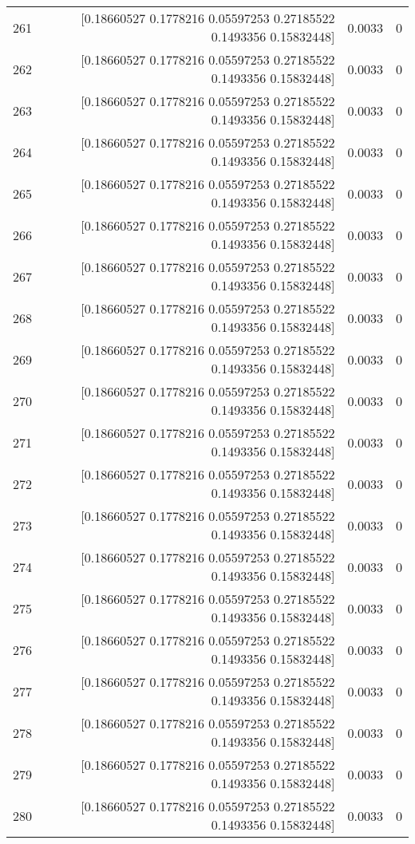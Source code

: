 \begin{longtable}{lrrr}
261 & [0.18660527 0.1778216  0.05597253 0.27185522 0.1493356  0.15832448] & 0.0033 & 0 \\
262 & [0.18660527 0.1778216  0.05597253 0.27185522 0.1493356  0.15832448] & 0.0033 & 0 \\
263 & [0.18660527 0.1778216  0.05597253 0.27185522 0.1493356  0.15832448] & 0.0033 & 0 \\
264 & [0.18660527 0.1778216  0.05597253 0.27185522 0.1493356  0.15832448] & 0.0033 & 0 \\
265 & [0.18660527 0.1778216  0.05597253 0.27185522 0.1493356  0.15832448] & 0.0033 & 0 \\
266 & [0.18660527 0.1778216  0.05597253 0.27185522 0.1493356  0.15832448] & 0.0033 & 0 \\
267 & [0.18660527 0.1778216  0.05597253 0.27185522 0.1493356  0.15832448] & 0.0033 & 0 \\
268 & [0.18660527 0.1778216  0.05597253 0.27185522 0.1493356  0.15832448] & 0.0033 & 0 \\
269 & [0.18660527 0.1778216  0.05597253 0.27185522 0.1493356  0.15832448] & 0.0033 & 0 \\
270 & [0.18660527 0.1778216  0.05597253 0.27185522 0.1493356  0.15832448] & 0.0033 & 0 \\
271 & [0.18660527 0.1778216  0.05597253 0.27185522 0.1493356  0.15832448] & 0.0033 & 0 \\
272 & [0.18660527 0.1778216  0.05597253 0.27185522 0.1493356  0.15832448] & 0.0033 & 0 \\
273 & [0.18660527 0.1778216  0.05597253 0.27185522 0.1493356  0.15832448] & 0.0033 & 0 \\
274 & [0.18660527 0.1778216  0.05597253 0.27185522 0.1493356  0.15832448] & 0.0033 & 0 \\
275 & [0.18660527 0.1778216  0.05597253 0.27185522 0.1493356  0.15832448] & 0.0033 & 0 \\
276 & [0.18660527 0.1778216  0.05597253 0.27185522 0.1493356  0.15832448] & 0.0033 & 0 \\
277 & [0.18660527 0.1778216  0.05597253 0.27185522 0.1493356  0.15832448] & 0.0033 & 0 \\
278 & [0.18660527 0.1778216  0.05597253 0.27185522 0.1493356  0.15832448] & 0.0033 & 0 \\
279 & [0.18660527 0.1778216  0.05597253 0.27185522 0.1493356  0.15832448] & 0.0033 & 0 \\
280 & [0.18660527 0.1778216  0.05597253 0.27185522 0.1493356  0.15832448] & 0.0033 & 0 \\

\end{longtable}
